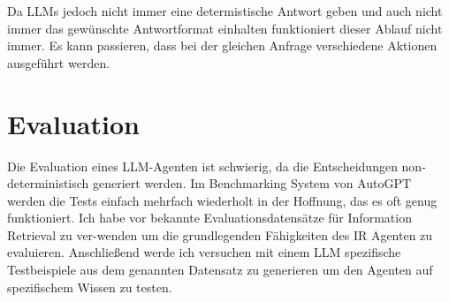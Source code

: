 \documentclass{report}
\begin{document}
Da LLMs jedoch nicht immer eine determistische Antwort geben und auch nicht immer das gewünschte Antwortformat einhalten funktioniert dieser Ablauf nicht immer.
Es kann passieren, dass bei der gleichen Anfrage verschiedene Aktionen ausgeführt werden.


\section*{Evaluation}
\sloppy
Die Evaluation eines LLM-Agenten ist schwierig, da die Entscheidungen non-deterministisch generiert werden.
Im Benchmarking System von AutoGPT werden die Tests einfach mehrfach wiederholt in der Hoffnung, das es oft genug funktioniert.
Ich habe vor bekannte Evaluationsdatensätze für Information Retrieval zu ver-wenden um die grundlegenden Fähigkeiten des IR Agenten zu evaluieren.
Anschließend werde ich versuchen mit einem LLM spezifische Testbeispiele aus dem genannten Datensatz zu generieren um den Agenten auf spezifischem Wissen zu testen.
\end{document}
